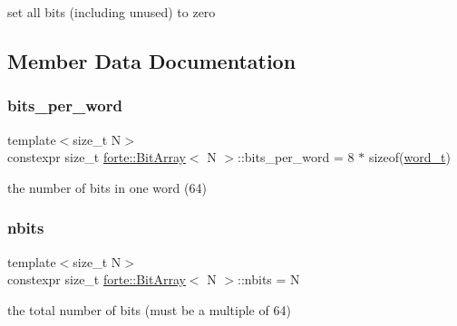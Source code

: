 set all bits (including unused) to zero 



\subsection{Member Data Documentation}
\mbox{\label{classforte_1_1_bit_array_ad5ca62ac879b44e0e28017a73fd6c3fd}} 
\subsubsection{\texorpdfstring{bits\+\_\+per\+\_\+word}{bits\_per\_word}}
{\footnotesize\ttfamily template$<$size\+\_\+t N$>$ \\
constexpr size\+\_\+t \mbox{\hyperlink{classforte_1_1_bit_array}{forte\+::\+Bit\+Array}}$<$ N $>$\+::bits\+\_\+per\+\_\+word = 8 $\ast$ sizeof(\mbox{\hyperlink{classforte_1_1_bit_array_a7f3b4ebbbe4bc80ce60cc6614cb565da}{word\+\_\+t}})\hspace{0.3cm}{\ttfamily [static]}}



the number of bits in one word (64) 

\mbox{\label{classforte_1_1_bit_array_a13866977deadcb098f2e5053025d12f0}} 
\subsubsection{\texorpdfstring{nbits}{nbits}}
{\footnotesize\ttfamily template$<$size\+\_\+t N$>$ \\
constexpr size\+\_\+t \mbox{\hyperlink{classforte_1_1_bit_array}{forte\+::\+Bit\+Array}}$<$ N $>$\+::nbits = N\hspace{0.3cm}{\ttfamily [static]}}



the total number of bits (must be a multiple of 64) 

\mbox{\label{classforte_1_1_bit_array_aeaa8016f00f9ffc5822081f7e45656e8}} 
